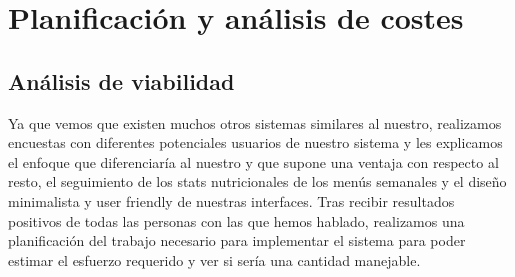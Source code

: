 \documentclass[12pt, a4paper, twoside]{book}
\begin{document}
	\section{Planificación y análisis de costes}
	\subsection{Análisis de viabilidad}
	Ya que vemos que existen muchos otros sistemas similares al nuestro, realizamos encuestas con diferentes potenciales usuarios de nuestro sistema y les explicamos el enfoque que diferenciaría al nuestro y que supone una ventaja con respecto al resto, el seguimiento de los stats nutricionales de los menús semanales y el diseño minimalista y user friendly de nuestras interfaces. Tras recibir resultados positivos de todas las personas con las que hemos hablado, realizamos una planificación del trabajo necesario para implementar el sistema para poder estimar el esfuerzo requerido y ver si sería una cantidad manejable.
\end{document}
